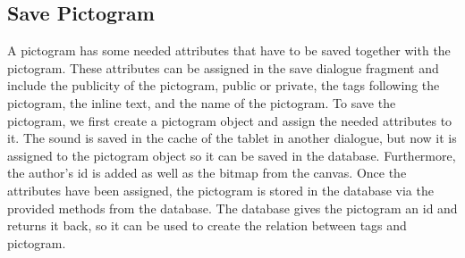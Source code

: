 \subsection{Save Pictogram}
A pictogram has some needed attributes that have to be saved together with the pictogram.
These attributes can be assigned in the save dialogue fragment and include the publicity of the pictogram, public or private, the tags following the pictogram, the inline text, and the name of the pictogram.
To save the pictogram, we first create a pictogram object and assign the needed attributes to it.
The sound is saved in the cache of the tablet in another dialogue, but now it is assigned to the pictogram object so it can be saved in the database.
Furthermore, the author's id is added as well as the bitmap from the canvas.
Once the attributes have been assigned, the pictogram is stored in the database via the provided methods from the database.
The database gives the pictogram an id and returns it back, so it can be used to create the relation between tags and pictogram.